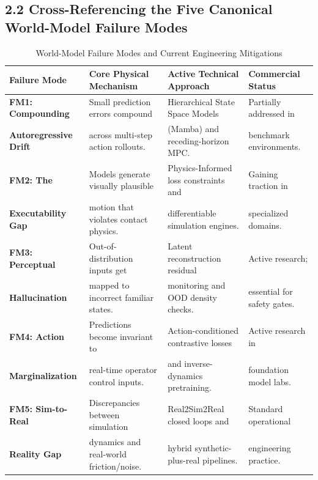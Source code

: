 \documentclass[11pt,a4paper]{article}
\begin{document}
\subsection{2.2 Cross-Referencing the Five Canonical World-Model Failure Modes}
\begin{table}[h!]
\centering
\small
\begin{tabularx}{\textwidth}{@{}l p{4.2cm} p{4.5cm} X@{}}
\toprule
\textbf{Failure Mode} & \textbf{Core Physical Mechanism} & \textbf{Active Technical Approach} & \textbf{Commercial Status} \\
\midrule
\textbf{FM1: Compounding} & Small prediction errors compound & Hierarchical State Space Models & Partially addressed in \\
\textbf{Autoregressive Drift} & across multi-step action rollouts. & (Mamba) and receding-horizon MPC. & benchmark environments. \\
\addlinespace
\textbf{FM2: The} & Models generate visually plausible & Physics-Informed loss constraints and & Gaining traction in \\
\textbf{Executability Gap} & motion that violates contact physics. & differentiable simulation engines. & specialized domains. \\
\addlinespace
\textbf{FM3: Perceptual} & Out-of-distribution inputs get & Latent reconstruction residual & Active research; \\
\textbf{Hallucination} & mapped to incorrect familiar states. & monitoring and OOD density checks. & essential for safety gates. \\
\addlinespace
\textbf{FM4: Action} & Predictions become invariant to & Action-conditioned contrastive losses & Active research in \\
\textbf{Marginalization} & real-time operator control inputs. & and inverse-dynamics pretraining. & foundation model labs. \\
\addlinespace
\textbf{FM5: Sim-to-Real} & Discrepancies between simulation & Real2Sim2Real closed loops and & Standard operational \\
\textbf{Reality Gap} & dynamics and real-world friction/noise. & hybrid synthetic-plus-real pipelines. & engineering practice. \\
\bottomrule
\end{tabularx}
\caption{World-Model Failure Modes and Current Engineering Mitigations}
\end{table}
\end{document}
